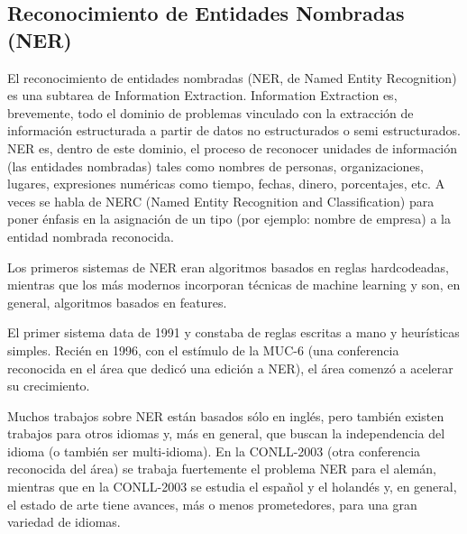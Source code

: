\subsection{Reconocimiento de Entidades Nombradas (NER)}
\label{subsec:nerc}

El reconocimiento de entidades nombradas (NER, de Named Entity
Recognition) es una subtarea de Information Extraction. Information
Extraction es, brevemente, todo el dominio de problemas vinculado con
la extracción de información estructurada a partir de datos no
estructurados o semi estructurados. NER es, dentro de este dominio, el
proceso de reconocer unidades de información (las entidades
nombradas) tales como nombres de personas, organizaciones, lugares,
expresiones numéricas como tiempo, fechas, dinero, porcentajes, etc.
A veces se habla de NERC (Named Entity Recognition and Classification)
para poner énfasis en la asignación de un tipo (por ejemplo: nombre
de empresa) a la entidad nombrada reconocida.

Los primeros sistemas de NER eran algoritmos basados en reglas
hardcodeadas, mientras que los más modernos incorporan técnicas de
machine learning y son, en general, algoritmos basados en features.

El primer sistema data de 1991 y constaba de reglas escritas a mano y
heurísticas simples. Recién en 1996, con el estímulo de la MUC-6
(una conferencia reconocida en el área que dedicó una edición a
NER), el área comenzó a acelerar su crecimiento.

Muchos trabajos sobre NER están basados sólo en inglés, pero también existen trabajos para otros idiomas y, más en general, que buscan la independencia del idioma (o también ser multi-idioma). En la CONLL-2003 (otra conferencia reconocida del área) se trabaja fuertemente el problema NER para el alemán, mientras que en la CONLL-2003 se estudia el español y el holandés y, en general, el estado de arte tiene avances, más o menos prometedores, para una gran variedad de idiomas.

